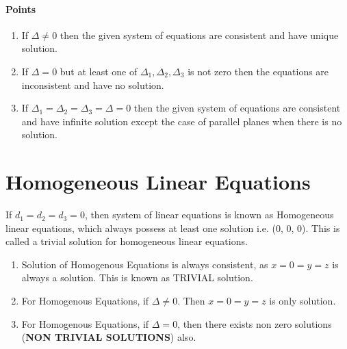 \documentclass{article}
\begin{document}
\paragraph{Points}
\begin{enumerate}
    \item If $\Delta \neq 0$ then the given system of equations are
    consistent and have unique solution.
    \item If $\Delta = 0$ but at least one of $\Delta_1, \Delta_2 , \Delta_3$ is not zero then
    the equations are inconsistent and have no solution.
    \item If $\Delta_1=\Delta_2 = \Delta_3=\Delta=0$ then the given system of equations are consistent and have infinite solution
    except the case of parallel planes when there is no
    solution. 
\end{enumerate}
\section{Homogeneous Linear Equations}
If ${{d}_{1}}={{d}_{2}}={{d}_{3}}=0$, then system of linear equations is known as Homogeneous linear equations, which always possess at least one solution i.e. (0, 0, 0). This is called a trivial solution for homogeneous linear equations.
\begin{enumerate}
    \item Solution of Homogenous Equations is always
    consistent, as $x = 0 = y = z$ is always a solution.
    This is known as TRIVIAL solution.
    \item  For Homogenous Equations, if $\Delta \neq 0$. Then
    $x = 0 = y = z$ is only solution.    
    \item  For Homogenous Equations, if $\Delta = 0$, then there exists
    non zero solutions (\textbf{NON TRIVIAL SOLUTIONS}) also.    
\end{enumerate}
\end{document}
